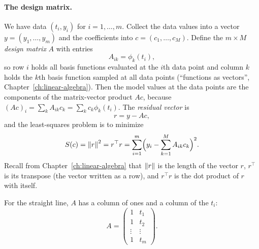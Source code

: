 \paragraph{The design matrix.} We have data $(t_i,y_i)$ for $i = 1,\dots,m$. Collect the data values into a vector $y = (y_1,\dots,y_m)$ and the coefficients into $c=(c_1,\dots,c_M)$. Define the $m\times M$ \emph{design matrix} $A$ with entries
\begin{equation}
A_{ik} = \phi_k(t_i),
\label{eq:least-squares-design}
\end{equation}
so row $i$ holds all basis functions evaluated at the $i$th data point and column $k$ holds the $k$th basis function sampled at all data points (``functions as vectors'', Chapter~\ref{ch:linear-algebra}). Then the model values at the data points are the components of the matrix-vector product $Ac$, because $(Ac)_i = \sum_k A_{ik}c_k = \sum_k c_k\phi_k(t_i)$. The \emph{residual vector} is
\begin{equation}
r = y - Ac,
\label{eq:least-squares-resid}
\end{equation}
and the least-squares problem is to minimize
\begin{equation}
S(c) = \left\lVert r\right\rVert^2 = r^\top r = \sum_{i=1}^m \Bigl(y_i - \sum_{k=1}^M A_{ik}c_k\Bigr)^2 .
\label{eq:least-squares-S}
\end{equation}
Recall from Chapter~\ref{ch:linear-algebra} that $\left\lVert r\right\rVert$ is the length of the vector $r$, $r^\top$ is its transpose (the vector written as a row), and $r^\top r$ is the dot product of $r$ with itself.

For the straight line, $A$ has a column of ones and a column of the $t_i$:
\[
A = \begin{pmatrix} 1 & t_1 \\ 1 & t_2\\ \vdots & \vdots\\ 1 & t_m\end{pmatrix}.
\]

